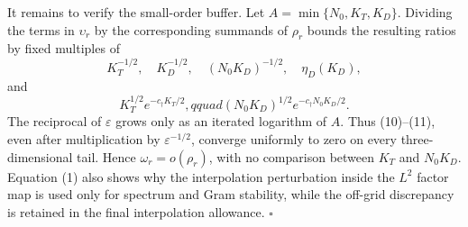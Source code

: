 It remains to verify the small-order buffer.  Let
\(A=\min\{N_0,K_T,K_D\}\).  Dividing the terms in \(\upsilon_r\) by the
corresponding summands of \(\rho_r\) bounds the resulting ratios by fixed
multiples of
\[
 K_T^{-1/2},\quad K_D^{-1/2},\quad (N_0K_D)^{-1/2},\quad
 \eta_D(K_D),                                               \tag{10}
\]
and
\[
 K_T^{1/2}e^{-c_\dagger K_T/2},qquad
 (N_0K_D)^{1/2}e^{-c_\dagger N_0K_D/2}.                    \tag{11}
\]
The reciprocal of \(\varepsilon\) grows only as an iterated logarithm of
\(A\).  Thus (10)--(11), even after multiplication by
\(\varepsilon^{-1/2}\), converge uniformly to zero on every
three-dimensional tail.  Hence \(\omega_r=o(\rho_r)\), with no comparison
between \(K_T\) and \(N_0K_D\).  Equation (1) also shows why the
interpolation perturbation inside the \(L^2\) factor map is used only for
spectrum and Gram stability, while the off-grid discrepancy is retained in
the final interpolation allowance. \(\square\)